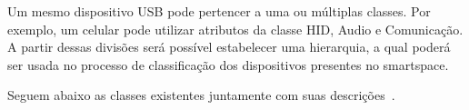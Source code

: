Um mesmo dispositivo USB pode pertencer a uma ou múltiplas classes. Por exemplo, um celular pode utilizar atributos da classe HID, Audio e Comunicação. A partir dessas divisões será possível estabelecer uma hierarquia, a qual poderá ser usada no processo de classificação dos dispositivos presentes no smartspace.

Seguem abaixo as classes existentes juntamente com suas descrições~\cite{usbclasscodes}.

\begin{comment}
\begin{table}
	\begin{center}
		\begin{tabular}{cccc}
		\hline
		\multicolumn{4}{c}{\textbf{Classes de Dispositivos}}													\\
		\hline
		Audio					&	Comunicação				&	Interface Humana (HID)	&	Físico 				\\
		\hline
		Imagem					&	Impressora				&	Disco Rígido			&	Hub 				\\
		\hline
		\emph{Smart Card}		&	Segurança de Conteúdo	&	Vídeo					&	Saúde Pessoal 		\\
		\hline
		Diagnóstico				&	Controlador Wireless	&	Diversos				&	Aplicação Específica\\
		\hline
		Fabricante Específico	&							&							&						\\
		\hline
		\end{tabular}
	\end{center}
	\caption{Exemplos de classes de dispositivos USB.~\cite{usbclasscodes}}
	\label{tab:dispositivos_usb}
\end{table}
\end{comment}

